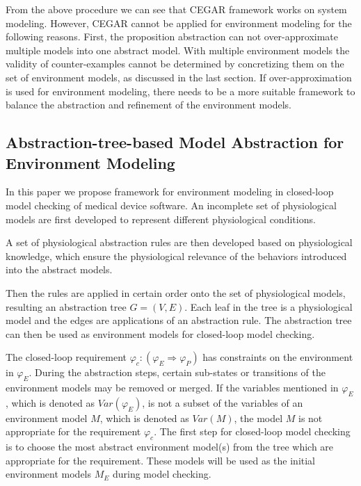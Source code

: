 From the above procedure we can see that CEGAR framework works on system modeling. However, CEGAR cannot be applied for environment modeling for the following reasons. First, the proposition abstraction can not over-approximate multiple models into one abstract model. 
With multiple environment models the validity of counter-examples cannot be determined by concretizing them on the set of environment models, as discussed in the last section. If over-approximation is used for environment modeling, there needs to be a more suitable framework to balance the abstraction and refinement of the environment models.

\subsection{Abstraction-tree-based Model Abstraction for Environment Modeling}
In this paper we propose framework for environment modeling in closed-loop model checking of medical device software. An incomplete set of physiological models are first developed to represent different physiological conditions. 

A set of physiological abstraction rules are then developed based on physiological knowledge, which ensure the physiological relevance of the behaviors introduced into the abstract models. 

Then the rules are applied in certain order onto the set of physiological models, resulting an abstraction tree $G=(V,E)$. Each leaf in the tree is a physiological model and the edges are applications of an abstraction rule. The abstraction tree can then be used as environment models for closed-loop model checking.

The closed-loop requirement $\varphi_c:(\varphi_E\Rightarrow\varphi_P)$ has constraints on the environment in $\varphi_E$. During the abstraction steps, certain sub-states or transitions of the environment models may be removed or merged. If the variables mentioned in $\varphi_E$, which is denoted as $Var(\varphi_E)$, is not a subset of the variables of an environment model $M$, which is denoted as $Var(M)$, the model $M$ is not appropriate for the requirement $\varphi_c$. The first step for closed-loop model checking is to choose the most abstract environment model(s) from the tree which are appropriate for the requirement. These models will be used as the initial environment models $M_E$ during model checking. 


